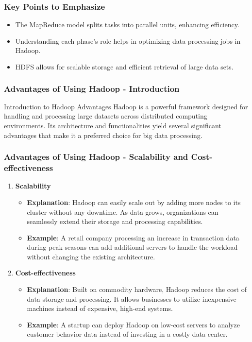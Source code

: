 \documentclass[aspectratio=169]{beamer}
\begin{document}
\begin{frame}
    \frametitle{Key Points to Emphasize}
    \begin{itemize}
        \item The MapReduce model splits tasks into parallel units, enhancing efficiency.
        \item Understanding each phase's role helps in optimizing data processing jobs in Hadoop.
        \item HDFS allows for scalable storage and efficient retrieval of large data sets.
    \end{itemize}
\end{frame}

\begin{frame}[fragile]
    \frametitle{Advantages of Using Hadoop - Introduction}
    \begin{block}{Introduction to Hadoop Advantages}
        Hadoop is a powerful framework designed for handling and processing large datasets across distributed computing environments. Its architecture and functionalities yield several significant advantages that make it a preferred choice for big data processing.
    \end{block}
\end{frame}

\begin{frame}[fragile]
    \frametitle{Advantages of Using Hadoop - Scalability and Cost-effectiveness}
    \begin{enumerate}
        \item \textbf{Scalability}
        \begin{itemize}
            \item \textbf{Explanation}: Hadoop can easily scale out by adding more nodes to its cluster without any downtime. As data grows, organizations can seamlessly extend their storage and processing capabilities.
            \item \textbf{Example}: A retail company processing an increase in transaction data during peak seasons can add additional servers to handle the workload without changing the existing architecture.
        \end{itemize}

        \item \textbf{Cost-effectiveness}
        \begin{itemize}
            \item \textbf{Explanation}: Built on commodity hardware, Hadoop reduces the cost of data storage and processing. It allows businesses to utilize inexpensive machines instead of expensive, high-end systems.
            \item \textbf{Example}: A startup can deploy Hadoop on low-cost servers to analyze customer behavior data instead of investing in a costly data center.
        \end{itemize}
    \end{enumerate}
\end{frame}
\end{document}
